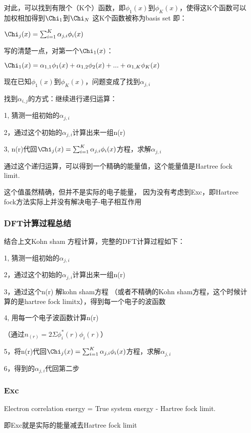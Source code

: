 \documentclass{article}
\begin{document}
对此，可以找到有限个（K个）函数，即$\phi_{1}(x)$到$\phi_{K}(x)$，使得这K个函数可以加权相加得到$\Chi_1$到$\Chi_N$
这K个函数被称为basis set
即：

$\Chi_j(x)=\sum^K_{i=1}\alpha_{j,i}\phi_{i}(x)$

写的清楚一点，对第一个$\Chi_1(x)$：

$\Chi_1(x)=\alpha_{1,1}\phi_{1}(x)+\alpha_{1,2}\phi_{2}(x)+...+\alpha_{1,K}\phi_{K}(x)$

现在已知$\phi_{1}(x)$到$\phi_{K}(x)$，问题变成了找到$\alpha_{j,i}$

找到$\alpha_{i,j}$的方式：继续进行递归运算：

1, 猜测一组初始的$\alpha_{j,i}$

2，通过这个初始的$\alpha_{j,i}$计算出来一组n(r)

3, n(r)代回$\Chi_j(x)=\sum^K_{i=1}\alpha_{j,i}\phi_{i}(x)$方程，求解$\alpha_{j,i}$

通过这个递归运算，可以得到一个精确的能量值，这个能量值是Hartree fock limit.

这个值虽然精确，但并不是实际的电子能量， 因为没有考虑到Exc，即Hartree fock方法实际上并没有解决电子-电子相互作用

\subsubsection{DFT计算过程总结}

结合上文Kohn sham 方程计算，完整的DFT计算过程如下：

1, 猜测一组初始的$\alpha_{j,i}$

2，通过这个初始的$\alpha_{j,i}$计算出来一组n(r)

3，通过这个n(r) 解kohn sham方程 （或者不精确的Kohn sham方程，这个时候计算的是hartree fock limitx），得到每一个电子的波函数

4, 用每一个电子波函数计算n(r)

（通过$n_{(r)} = 2\Sigma \phi_i^*(r)\phi_i(r)$）

5，将n(r)代回$\Chi_j(x)=\sum^K_{i=1}\alpha_{j,i}\phi_{i}(x)$方程，求解$\alpha_{j,i}$

6，得到的$\alpha_{j,i}$代回第二步

\subsubsection {Exc}

Electron correlation energy = True system energy - Hartree fock limit.

即Exc就是实际的能量减去Hartree fock limit
\end{document}
